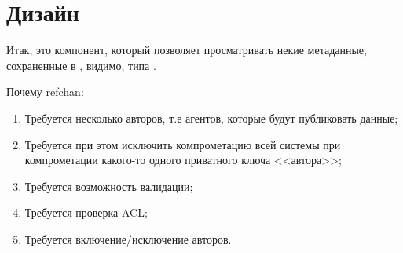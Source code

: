 
\chapter{Дизайн}


Итак,  это компонент, который позволяет
просматривать некие метаданные, сохраненные в , видимо,
типа .

Почему refchan:

\begin{enumerate}
  \item Требуется несколько авторов, т.е агентов,
        которые будут публиковать данные;
  \item Требуется при этом исключить компрометацию всей
        системы при компрометации какого-то одного приватного ключа <<автора>>;
  \item Требуется возможность валидации;
  \item Требуется проверка ACL;
  \item Требуется включение/исключение авторов.
\end{enumerate}









